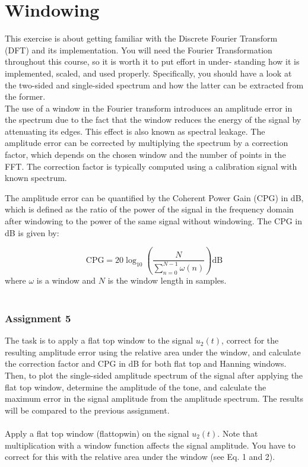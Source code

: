 \documentclass[
	a4paper,
	11pt,
]{article}
\begin{document}
\section{Windowing}
This exercise is about getting familiar with the Discrete Fourier Transform (DFT) and its implementation. You will need the Fourier Transformation throughout this course, so it is worth it to put effort in under- standing how it is implemented, scaled, and used properly. Specifically, you should have a look at the two-sided and single-sided spectrum and how the latter can be extracted from the former.
\\
The use of a window in the Fourier transform introduces an amplitude error in the spectrum due to the fact that the window reduces the energy of the signal by attenuating its edges. This effect is also known as spectral leakage. The amplitude error can be corrected by multiplying the spectrum by a correction factor, which depends on the chosen window and the number of points in the FFT. The correction factor is typically computed using a calibration signal with known spectrum.

The amplitude error can be quantified by the Coherent Power Gain (CPG) in dB, which is defined as the ratio of the power of the signal in the frequency domain after windowing to the power of the same signal without windowing. The CPG in dB is given by:


\begin{equation}
\text{CPG} = 20\log_{10} \left(\frac{N}{\sum^{N-1}_{n=0} \omega (n)}\right) \text{dB}
\end{equation}
where \(\omega\) is a window and \(N\) is the window length in samples.
\\
\\
\subsubsection{Assignment 5}
The task is to apply a flat top window to the signal \(u_2(t)\), correct for the resulting amplitude error using the relative area under the window, and calculate the correction factor and CPG in dB for both flat top and Hanning windows. Then, to plot the single-sided amplitude spectrum of the signal after applying the flat top window, determine the amplitude of the tone, and calculate the maximum error in the signal amplitude from the amplitude spectrum. The results will be compared to the previous assignment.\\
\\
Apply a flat top window (flattopwin) on the signal \(u_2 (t)\). Note that multiplication with a window function affects the signal amplitude. You have to correct for this with the relative area under the window (see Eq. 1 and 2).\\
\end{document}
